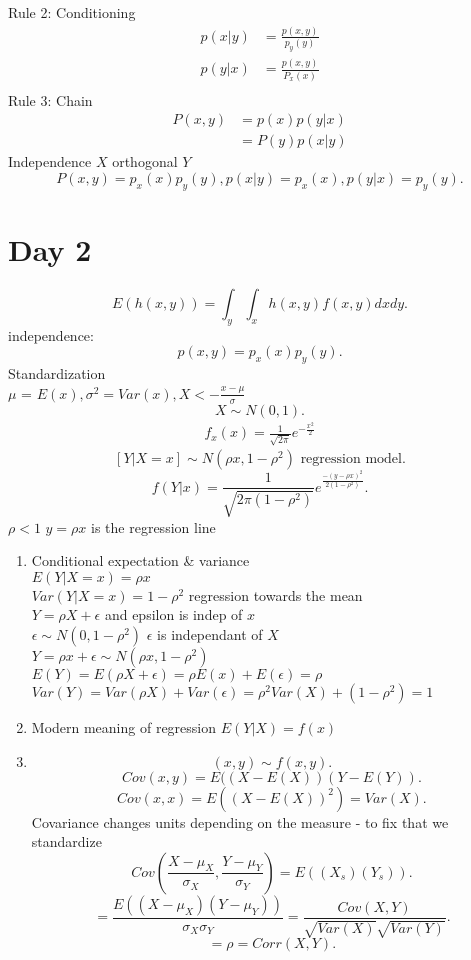 \documentclass{article}
\begin{document}
   Rule 2: Conditioning
   \begin{align*}
       p(x|y) &= \frac{p(x,y)}{p_y(y)}\\
       p(y|x) &= \frac{p(x,y)}{P_x(x)}\\
   \end{align*}
   Rule 3: Chain
   \begin{align*}
       P(x,y) &= p(x)p(y|x) \\
              &= P(y)p(x|y)
   \end{align*}
   Independence $X$ orthogonal $Y$ 
   \[
   P(x,y) = p_x(x)p_y(y), p(x|y) = p_x(x), p(y|x) = p_y(y)
   .\] 
   \section{Day 2}
   \[
   E(h(x,y)) = \int_{y}^{}\int_{x}^{}h(x,y)f(x,y)dxdy
   .\] 
   independence:
   \[
   p(x,y) = p_x(x)p_y(y)
   .\] 
   Standardization\\
   $\mu $ = $E(x), \sigma^2=Var(x), X <- \frac{x-\mu }{\sigma }$
   \[
   X \sim N(0,1)
   .\] 
   \begin{align*}
       f_x(x) = \frac{1}{\sqrt{2\pi }}e^{-\frac{x^2}{2}}
   \end{align*}
   \[
       [Y|X=x] \sim N(\rho x, 1- \rho^2) \text{  regression model}
   .\] 
   \[
   f(Y|x) = \frac{1}{\sqrt{2\pi (1-\rho^2)}}e^{\frac{-(y-\rho x)^2}{2(1-\rho^2)}}
   .\] 
   $\rho < 1$
   $y = \rho x$ is the regression line
   \begin{enumerate}
       \item Conditional expectation \& variance\\
           $E(Y|X = x) = \rho x$\\
            $Var(Y|X = x) = 1-\rho^2$ regression towards the mean\\
            $Y = \rho X + \epsilon $ and epsilon is indep of  $x$\\
            $\epsilon \sim N(0, 1-\rho^2)$ $\epsilon $ is independant of $X$\\
            $Y = \rho x + \epsilon  \sim N(\rho x, 1- \rho^2)$ \\
            $E(Y) = E(\rho X + \epsilon ) = \rho E(x) + E(\epsilon ) = \rho$\\
            $Var(Y) = Var(\rho X) + Var(\epsilon ) = \rho^2Var(X) + (1-\rho^2) = 1$
        \item Modern meaning of regression
            $E(Y|X) = f(x)$ 
        \item 
            \[
                (x,y) \sim f(x,y)
            .\] 
            \[
            Cov(x,y) = E((X-E(X))(Y-E(Y))
            .\] 
            \[
            Cov(x,x) = E((X-E(X))^2) = Var(X)
            .\] 
            Covariance changes units depending on the measure - to fix that we standardize\\
            \[
                Cov(\frac{X-\mu_X}{\sigma_X}, \frac{Y-\mu_Y}{\sigma_Y}) = E((X_{s})(Y_{s}))
            .\] 
            \[
            = \frac{E((X-\mu _X)(Y-\mu_Y))}{\sigma _X\sigma _Y} = \frac{Cov(X,Y)}{\sqrt{Var(X)}\sqrt{Var(Y)}} 
            .\] 
            \[
            = \rho = Corr(X,Y)
            .\] 
            

   \end{enumerate}
\end{document}
